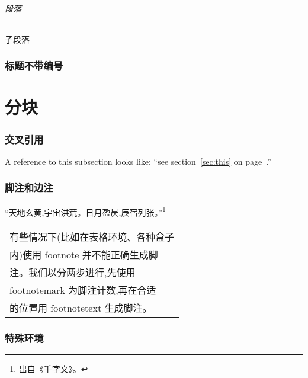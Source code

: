 \documentclass[a4paper]{ctexart}
\begin{document}
    \paragraph{段落}
    \subparagraph{子段落}
    \section*{标题不带编号}
    \part{分块}
    \section{交叉引用}
    A reference to this subsection\label{sec:this} looks like: %
    ``see section~\ref{sec:this} on page~\pageref{sec:this}.''
    \section{脚注和边注}
    “天地玄黄,宇宙洪荒。日月盈昃,辰宿列张。”\footnote{出自《千字文》。}\par
    \begin{tabular}{l}
        \hline
        有些情况下(比如在表格环境、各种盒子\\
        内)使用 footnote 并不能正确生成脚\\
        注。我们以分两步进行,先使用 \\
        footnotemark 为脚注计数,再在合适\\
        的位置用 footnotetext 生成脚注。\footnotemark\\
        \hline
    \end{tabular}
    \section{特殊环境}
\end{document}
